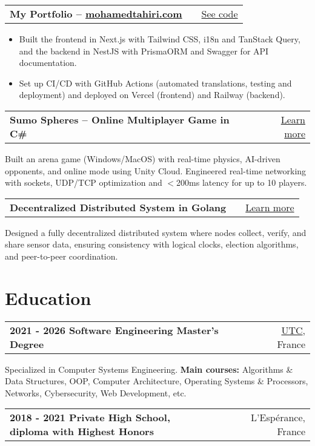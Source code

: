 \documentclass[a4paper,10pt]{article}
\makeatletter
\newenvironment{jobshort}[2]
    {
    \begin{tabularx}{\linewidth}{@{}l X r@{}}
    \textbf{#1} & \hfill &  #2 \\[3.75pt]
    \end{tabularx}
    } {}
\newenvironment{joblong}[2]
    {
    \begin{tabularx}{\linewidth}{@{}l X r@{}}
    \textbf{#1} & \hfill &  #2 \\[3.75pt]
    \end{tabularx}
    \begin{minipage}[t]{\linewidth}
    \begin{itemize}[nosep,after=\strut, leftmargin=1em, itemsep=3pt,label=--]
    }
    {
    \end{itemize}
    \end{minipage}    
    }
\makeatother
\begin{document}
\begin{joblong}{My Portfolio – \href{https://mohamedtahiri.com}{mohamedtahiri.com}}{\href{https://github.com/moha-tah/portfolio}{See code}}
    \item Built the frontend in Next.js with Tailwind CSS, i18n and TanStack Query, and the backend in NestJS with PrismaORM and Swagger for API documentation.
    \item Set up CI/CD with GitHub Actions (automated translations, testing and deployment) and deployed on Vercel (frontend) and Railway (backend).
\end{joblong}

\begin{jobshort}{Sumo Spheres – Online Multiplayer Game in C\#}{\href{https://mohamedtahiri.com/projects/online-multiplayer-game}{Learn more}}
    Built an arena game (Windows/MacOS) with real-time physics, AI-driven opponents, and online mode using Unity Cloud. Engineered real-time networking with sockets, UDP/TCP optimization and $<$200ms latency for up to 10 players.
\end{jobshort}

\begin{jobshort}{Decentralized Distributed System in Golang}{\href{https://mohamedtahiri.com/projects/decentralized-distributed-system}{Learn more}}
    Designed a fully decentralized distributed system where nodes collect, verify, and share sensor data, ensuring consistency with logical clocks, election algorithms, and peer-to-peer coordination.
\end{jobshort}

\section{Education}

\begin{jobshort}{2021 - 2026    Software Engineering Master's Degree}{\href{https://www.utc.fr}{UTC}, France}
    Specialized in Computer Systems Engineering. \textbf{Main courses:} Algorithms \& Data Structures, OOP, Computer Architecture, Operating Systems \& Processors, Networks, Cybersecurity, Web Development, etc.
\end{jobshort}

\begin{jobshort}{2018 - 2021    Private High School, diploma with Highest Honors}{L'Espérance, France}
\end{jobshort}
\end{document}
